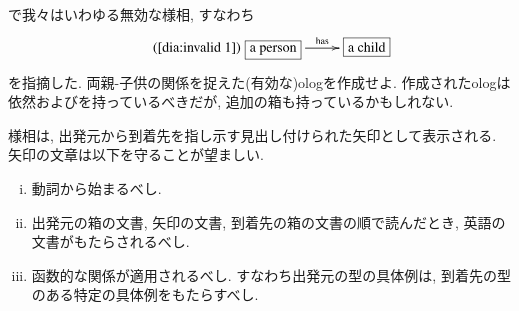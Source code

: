 \begin{exercise}
\pageref{dia:invalid 1}で我々はいわゆる無効な様相, すなわち\begin{align}\tag{\ref{dia:invalid 1}}\xymatrixnocompile{\fbox{a person}\LA{r}{has}&\fbox{a child}}\end{align}を指摘した.
両親-子供の関係を捉えた(有効な)ologを作成せよ. 作成されたologは依然およびを持っているべきだが, 追加の箱も持っているかもしれない.
\end{exercise}

\begin{rules}\label{rules:aspects}


様相は, 出発元から到着先を指し示す見出し付けられた矢印として表示される. 矢印の文章は以下を守ることが望ましい.


\begin{enumerate}[(i)]
\item 動詞から始まるべし.
\item 出発元の箱の文書, 矢印の文書, 到着先の箱の文書の順で読んだとき, 英語の文書がもたらされるべし. 
\item 函数的な関係が適用されるべし. すなわち出発元の型の具体例は, 到着先の型のある特定の具体例をもたらすべし.
\end{enumerate}

\end{rules}

